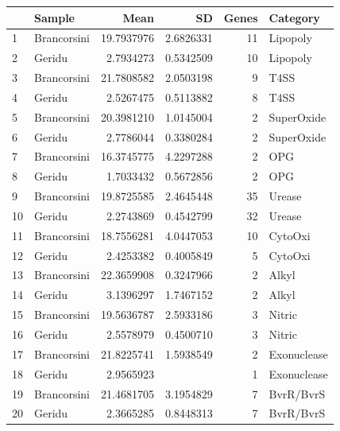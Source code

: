 \begin{table}[ht]
\centering
\begin{tabular}{llrrrl}
  \hline
 & Sample & Mean & SD & Genes & Category \\ 
  \hline
1 & Brancorsini & 19.7937976 & 2.6826331 & 11 & Lipopoly \\ 
  2 & Geridu & 2.7934273 & 0.5342509 & 10 & Lipopoly \\ 
  3 & Brancorsini & 21.7808582 & 2.0503198 & 9 & T4SS \\ 
  4 & Geridu & 2.5267475 & 0.5113882 & 8 & T4SS \\ 
  5 & Brancorsini & 20.3981210 & 1.0145004 & 2 & SuperOxide \\ 
  6 & Geridu & 2.7786044 & 0.3380284 & 2 & SuperOxide \\ 
  7 & Brancorsini & 16.3745775 & 4.2297288 & 2 & OPG \\ 
  8 & Geridu & 1.7033432 & 0.5672856 & 2 & OPG \\ 
  9 & Brancorsini & 19.8725585 & 2.4645448 & 35 & Urease \\ 
  10 & Geridu & 2.2743869 & 0.4542799 & 32 & Urease \\ 
  11 & Brancorsini & 18.7556281 & 4.0447053 & 10 & CytoOxi \\ 
  12 & Geridu & 2.4253382 & 0.4005849 & 5 & CytoOxi \\ 
  13 & Brancorsini & 22.3659908 & 0.3247966 & 2 & Alkyl \\ 
  14 & Geridu & 3.1396297 & 1.7467152 & 2 & Alkyl \\ 
  15 & Brancorsini & 19.5636787 & 2.5933186 & 3 & Nitric \\ 
  16 & Geridu & 2.5578979 & 0.4500710 & 3 & Nitric \\ 
  17 & Brancorsini & 21.8225741 & 1.5938549 & 2 & Exonuclease \\ 
  18 & Geridu & 2.9565923 &  & 1 & Exonuclease \\ 
  19 & Brancorsini & 21.4681705 & 3.1954829 & 7 & BvrR/BvrS \\ 
  20 & Geridu & 2.3665285 & 0.8448313 & 7 & BvrR/BvrS \\ 
   \hline
\end{tabular}
\end{table}
